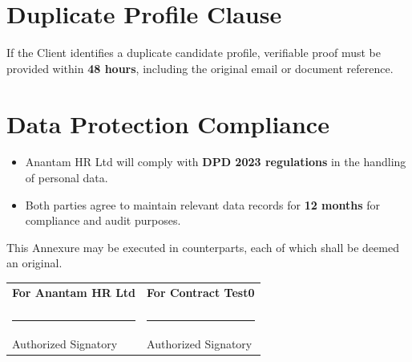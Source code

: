 \documentclass[12pt]{article}
\begin{document}
\section{Duplicate Profile Clause}

If the Client identifies a duplicate candidate profile, verifiable proof must be provided within \textbf{48 hours}, including the original email or document reference.

\section{Data Protection Compliance}

\begin{itemize}
\item Anantam HR Ltd will comply with \textbf{DPD 2023 regulations} in the handling of personal data.

\item Both parties agree to maintain relevant data records for \textbf{12 months} for compliance and audit purposes.
\end{itemize}

\vspace{1cm}

This Annexure may be executed in counterparts, each of which shall be deemed an original.

\vspace{1.5cm}

\begin{tabular}{p{7cm} p{7cm}}

\textbf{For Anantam HR Ltd} & \textbf{For Contract Test0} \\

\vspace{2cm} & \vspace{2cm} \\

\rule{6cm}{0.4pt} & \rule{6cm}{0.4pt} \\
Authorized Signatory & Authorized Signatory \\

\end{tabular}
\end{document}
